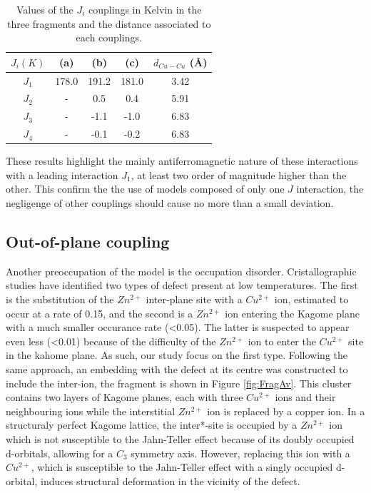 \documentclass[12pt]{report}
\numberwithin{equation}{section}
\begin{document}
\begin{table}
    \centering
    \begin{tabular}{c c c c c}
        \hline
        $J_i (K)$ & (a) & (b) & (c) & $d_{Cu-Cu}$ (\AA{}) \\
        \hline
        $J_1$ & 178.0 & 191.2 & 181.0 &3.42\\
        $J_2$ & - & 0.5  & 0.4& 5.91\\
        $J_3$ & -& -1.1& -1.0&6.83\\
        $J_4$ & -& -0.1 & -0.2& 6.83\\
        \hline
    \end{tabular}
    \caption{Values of the $J_i$ couplings in Kelvin in the three fragments and the distance associated to each couplings.}
    \label{tab:ResultatsDFT}
\end{table}

These results highlight the mainly antiferromagnetic nature of these interactions with a leading interaction $J_1$, at least two order of magnitude higher than the other.
This confirm the the use of models composed of only one $J$ interaction, the negligenge of other couplings should cause no more than a small deviation.

\subsection{Out-of-plane coupling}

Another preoccupation of the model is the occupation disorder. Cristallographic studies have identified two types of defect present at low temperatures. 
The first is the substitution of the $Zn^{2+}$ inter-plane site with a $Cu^{2+}$ ion, estimated to occur at a rate of 0.15, and the second is a $Zn^{2+}$ ion entering the Kagome plane with a much smaller occurance rate (<0.05).
The latter is suspected to appear even less (<0.01) because of the difficulty of the $Zn^{2+}$ ion to enter the $Cu^{2+}$ site in the kahome plane. 
As such, our study focus on the first type.
Following the same approach, an embedding with the defect at its centre was constructed to include the inter-ion, the fragment is shown in Figure \ref{fig:FragAv}.
This cluster contains two layers of Kagome planes, each with three $Cu^{2+}$ ions and their neighbouring ions while the interstitial $Zn^{2+}$ ion is replaced by a copper ion.
In a structuraly perfect Kagome lattice, the inter*-site is occupied by a $Zn^{2+}$ ion which is not susceptible to the Jahn-Teller effect because of its doubly occupied d-orbitals, allowing for a $C_3$ symmetry axis.
However, replacing this ion with a $Cu^{2+}$, which is susceptible to the Jahn-Teller effect with a singly occupied d-orbital, induces structural deformation in the vicinity of the defect.
\end{document}
